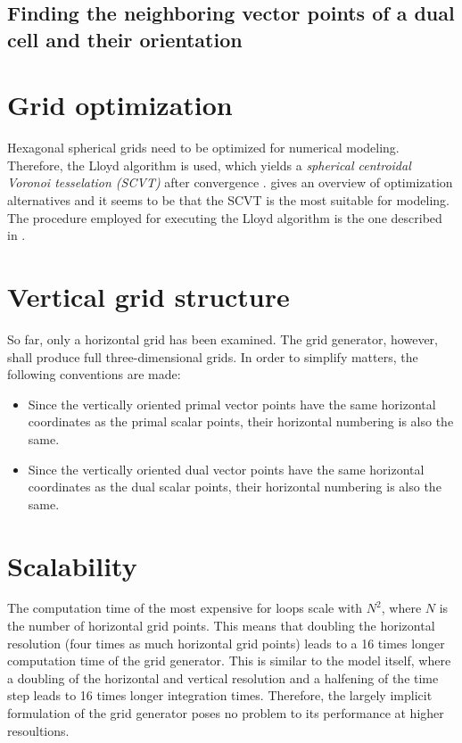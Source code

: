 \documentclass[10pt]{report}
\begin{document}
\subsection{Finding the neighboring vector points of a dual cell and their orientation}
\label{sec:finding_the_neighboring_vector_points_of_a_dual_cell_and_their_orientation}

\section{Grid optimization}
\label{sec:grid_optimization}

Hexagonal spherical grids need to be optimized for numerical modeling. Therefore, the Lloyd algorithm is used, which yields a \textit{spherical centroidal Voronoi tesselation (SCVT)} after convergence \cite{Du2003}. \cite{PEIXOTO201361} gives an overview of optimization alternatives and it seems to be that the SCVT is the most suitable for modeling. The procedure employed for executing the Lloyd algorithm is the one described in \cite{10.1175/MWR2991.1}.

\section{Vertical grid structure}
\label{sec:vertical_grid_structure}

So far, only a horizontal grid has been examined. The grid generator, however, shall produce full three-dimensional grids. In order to simplify matters, the following conventions are made:
%
\begin{itemize}
\item Since the vertically oriented primal vector points have the same horizontal coordinates as the primal scalar points, their horizontal numbering is also the same.
\item Since the vertically oriented dual vector points have the same horizontal coordinates as the dual scalar points, their horizontal numbering is also the same.
\end{itemize}

\section{Scalability}
\label{sec:scalability}

The computation time of the most expensive for loops scale with $N^2$, where $N$ is the number of horizontal grid points. This means that doubling the horizontal resolution (four times as much horizontal grid points) leads to a 16 times longer computation time of the grid generator. This is similar to the model itself, where a doubling of the horizontal and vertical resolution and a halfening of the time step leads to 16 times longer integration times. Therefore, the largely implicit formulation of the grid generator poses no problem to its performance at higher resoultions.
\end{document}
